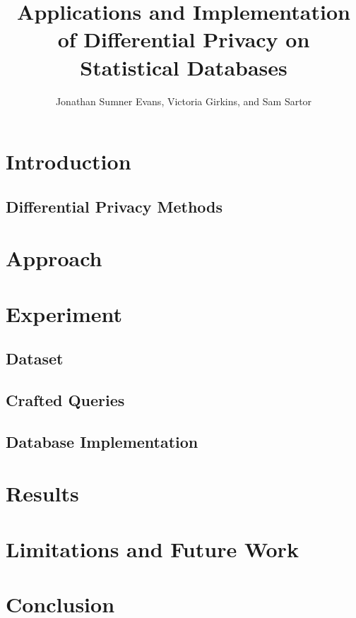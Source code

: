 \documentclass[12pt]{IEEEtran}
\title{Applications and Implementation of Differential Privacy on Statistical
Databases}
\author{Jonathan Sumner Evans, Victoria Girkins, and Sam Sartor}
\begin{document}
\maketitle

\begin{abstract}
\end{abstract}

\section{Introduction}

\subsection{Differential Privacy Methods}

\section{Approach}

\section{Experiment}
\subsection{Dataset}
\subsection{Crafted Queries}
\subsection{Database Implementation}

\section{Results}

\section{Limitations and Future Work}

\section{Conclusion}

\printbibliography
\end{document}

